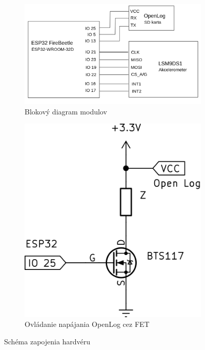 \begin{figure}[h]
\centering
\begin{subfigure}[b]{0.65\textwidth}
    \centering
    \includegraphics[width=\textwidth]{figures/design/block-circuit-diagram.png}
    \caption{Blokový diagram modulov}
       \label{schematics:block}
\end{subfigure}
\hfill
\begin{subfigure}[b]{0.3\textwidth}
    \centering
    \includegraphics[width=\textwidth]{figures/design/fet.png}
    \caption{Ovládanie napájania OpenLog cez FET}
    \label{schematics:fet}
\end{subfigure}
\label{schematics}
\caption{Schéma zapojenia hardvéru}
\end{figure}

